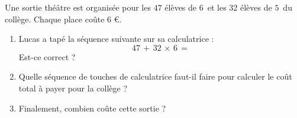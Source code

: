 
\begin{exercice}\label{exosmath-0735}

Une sortie théâtre est organisée pour les $47$ élèves de \( 6\)\ieme\ et les $32$ élèves de \( 5\)\ieme\ du collège. Chaque place coûte 6 €.

\begin{enumerate}
    \item
        Lucas a tapé la séquence suivante sur sa calculatrice :
\begin{equation}
    \boxed{47}\,\boxed{+}\,\boxed{32}\,\boxed{\times}\,\boxed{6}\,\boxed{=}
\end{equation}
        Est-ce correct ?
    \item
        Quelle séquence de touches de calculatrice faut-il faire pour calculer le coût total à payer pour la collège ?
    \item
        Finalement, combien coûte cette sortie ?
\end{enumerate}

\end{exercice}
